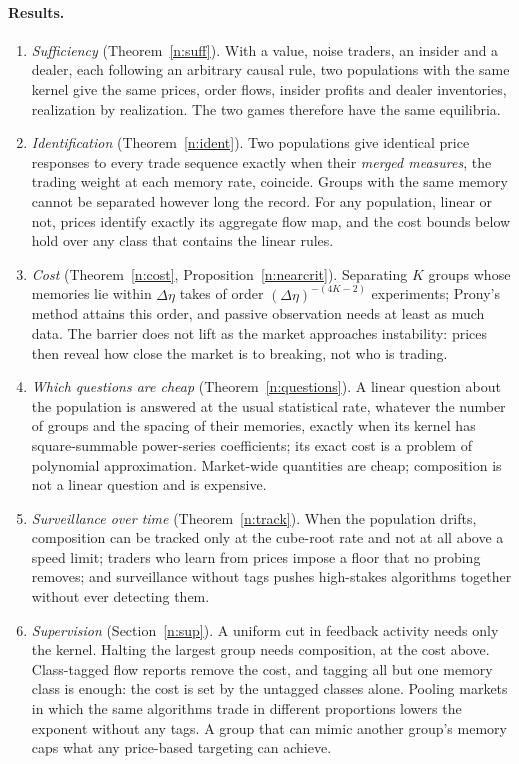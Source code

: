 \paragraph{Results.}
\begin{enumerate}[label=(\arabic*),leftmargin=*,itemsep=2pt]
\item \emph{Sufficiency} (Theorem~\ref{n:suff}). With a value, noise traders, an insider and a dealer, each following an arbitrary causal rule, two populations with the same kernel give the same prices, order flows, insider profits and dealer inventories, realization by realization. The two games therefore have the same equilibria.
\item \emph{Identification} (Theorem~\ref{n:ident}). Two populations give identical price responses to every trade sequence exactly when their \emph{merged measures}, the trading weight at each memory rate, coincide. Groups with the same memory cannot be separated however long the record. For any population, linear or not, prices identify exactly its aggregate flow map, and the cost bounds below hold over any class that contains the linear rules.
\item \emph{Cost} (Theorem~\ref{n:cost}, Proposition~\ref{n:nearcrit}). Separating $K$ groups whose memories lie within $\Delta\eta$ takes of order $(\Delta\eta)^{-(4K-2)}$ experiments; Prony's method attains this order, and passive observation needs at least as much data. The barrier does not lift as the market approaches instability: prices then reveal how close the market is to breaking, not who is trading.
\item \emph{Which questions are cheap} (Theorem~\ref{n:questions}). A linear question about the population is answered at the usual statistical rate, whatever the number of groups and the spacing of their memories, exactly when its kernel has square-summable power-series coefficients; its exact cost is a problem of polynomial approximation. Market-wide quantities are cheap; composition is not a linear question and is expensive.
\item \emph{Surveillance over time} (Theorem~\ref{n:track}). When the population drifts, composition can be tracked only at the cube-root rate and not at all above a speed limit; traders who learn from prices impose a floor that no probing removes; and surveillance without tags pushes high-stakes algorithms together without ever detecting them.
\item \emph{Supervision} (Section~\ref{n:sup}). A uniform cut in feedback activity needs only the kernel. Halting the largest group needs composition, at the cost above. Class-tagged flow reports remove the cost, and tagging all but one memory class is enough: the cost is set by the untagged classes alone. Pooling markets in which the same algorithms trade in different proportions lowers the exponent without any tags. A group that can mimic another group's memory caps what any price-based targeting can achieve.

\end{enumerate}
